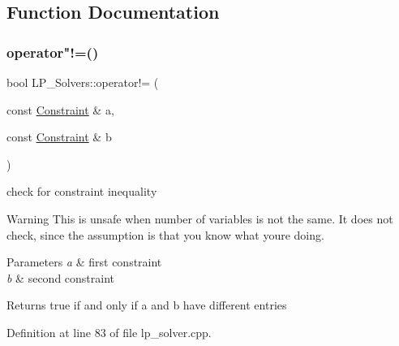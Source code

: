 \subsection{Function Documentation}
\mbox{\label{namespace_l_p___solvers_a49c6d0c3337c5bc3379a273ec332ba5c}} 
\subsubsection{\texorpdfstring{operator"!=()}{operator!=()}\hspace{0.1cm}{\footnotesize\ttfamily [1/2]}}
{\footnotesize\ttfamily bool L\+P\+\_\+\+Solvers\+::operator!= (\begin{DoxyParamCaption}\item[{const \hyperlink{group___c_l_s_solvers_class_l_p___solvers_1_1_constraint}{Constraint} \&}]{a,  }\item[{const \hyperlink{group___c_l_s_solvers_class_l_p___solvers_1_1_constraint}{Constraint} \&}]{b }\end{DoxyParamCaption})}



check for constraint inequality 

\begin{DoxyWarning}{Warning}
This is unsafe when number of variables is not the same. It does not check, since the assumption is that you know what you\textquotesingle{}re doing. 
\end{DoxyWarning}

\begin{DoxyParams}{Parameters}
{\em a} & first constraint \\
\hline
{\em b} & second constraint \\
\hline
\end{DoxyParams}
\begin{DoxyReturn}{Returns}
{\ttfamily true} if and only if {\ttfamily a} and {\ttfamily b} have different entries 
\end{DoxyReturn}


Definition at line 83 of file lp\+\_\+solver.\+cpp.

\mbox{\label{namespace_l_p___solvers_a20a1994c15aacbfd4215abf13fdf1e6d}} 
